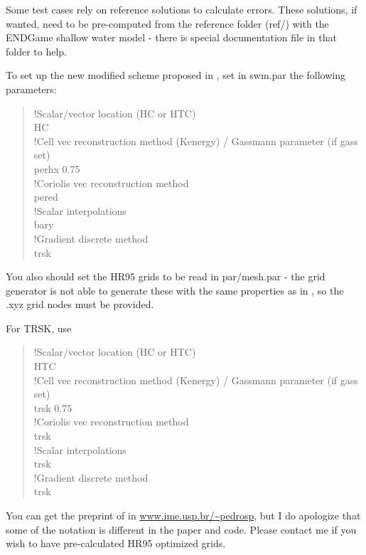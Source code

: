 \documentclass[a4paper,10pt]{article}
\begin{document}
Some test cases rely on reference solutions to calculate errors. These solutions, if wanted, need to be pre-computed from the reference folder (ref/) with the ENDGame shallow water model - there is special documentation file in that folder to help.

To set up the new modified scheme proposed in \cite{Peixoto2015}, set in swm.par the following parameters:
\begin{verse}
!Scalar/vector location (HC or HTC) \\
HC \\
!Cell vec reconstruction method (Kenergy) / Gassmann parameter (if gass set) \\
perhx 0.75 \\
!Coriolis vec reconstruction method \\
pered \\
!Scalar interpolations \\
bary \\
!Gradient discrete method \\
trsk \\
\end{verse}
You also should set the HR95 grids to be read in par/mesh.par - the grid generator is not able to generate these with the same properties as in \cite{Heikes1995a}, so the .xyz grid nodes must be provided.

For TRSK, use
\begin{verse}
!Scalar/vector location (HC or HTC) \\
HTC \\
!Cell vec reconstruction method (Kenergy) / Gassmann parameter (if gass set) \\
trsk 0.75 \\
!Coriolis vec reconstruction method \\
trsk \\
!Scalar interpolations \\
trsk \\
!Gradient discrete method \\
trsk \\
\end{verse}

You can get the preprint of \cite{Peixoto2015} in \url{www.ime.usp.br/~pedrosp}, but I do apologize that some of the notation is different in the paper and code. Please contact me if you wish to have pre-calculated HR95 optimized grids.


\end{document}
